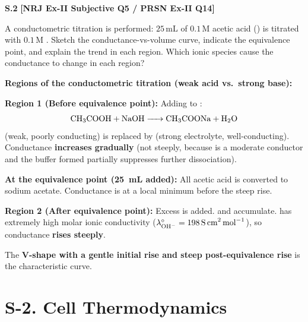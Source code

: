 \begin{problembox}
\textbf{S.2} \hfill \textbf{[NRJ Ex-II Subjective Q5 / PRSN Ex-II Q14]}

A conductometric titration is performed: $25\,\text{mL}$ of $0.1\,\text{M}$ acetic acid () is titrated with $0.1\,\text{M}$ . Sketch the conductance-vs-volume curve, indicate the equivalence point, and explain the trend in each region. Which ionic species cause the conductance to change in each region?
\end{problembox}
\begin{solution}
\textbf{Regions of the conductometric titration (weak acid vs.\ strong base):}

\textbf{Region 1 (Before equivalence point):} Adding  to :
\begin{equation*}
    \ce{CH3COOH + NaOH -> CH3COONa + H2O}
\end{equation*}
 (weak, poorly conducting) is replaced by  (strong electrolyte, well-conducting). Conductance \textbf{increases gradually} (not steeply, because  is a moderate conductor and the buffer formed partially suppresses further dissociation).

\textbf{At the equivalence point (25~mL added):} All acetic acid is converted to sodium acetate. Conductance is at a local minimum before the steep rise.

\textbf{Region 2 (After equivalence point):} Excess  is added.  and  accumulate.  has extremely high molar ionic conductivity ($\lambda^\circ_{\ce{OH-}} = 198\,\text{S\,cm}^2\,\text{mol}^{-1}$), so conductance \textbf{rises steeply}.

The \textbf{V-shape with a gentle initial rise and steep post-equivalence rise} is the characteristic curve.
\end{solution}

\section*{S-2. Cell Thermodynamics}

